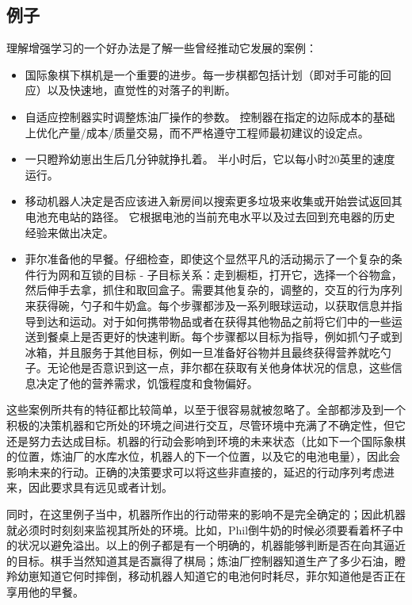 \documentclass{ctexart}
\begin{document}
        \subsection{例子}
            理解增强学习的一个好办法是了解一些曾经推动它发展的案例：
            \begin{itemize}
              \item 国际象棋下棋机是一个重要的进步。每一步棋都包括计划（即对手可能的回应）以及快速地，直觉性的对落子的判断。
              \item 自适应控制器实时调整炼油厂操作的参数。 控制器在指定的边际成本的基础上优化产量/成本/质量交易，而不严格遵守工程师最初建议的设定点。
              \item 一只瞪羚幼崽出生后几分钟就挣扎着。 半小时后，它以每小时20英里的速度运行。
              \item 移动机器人决定是否应该进入新房间以搜索更多垃圾来收集或开始尝试返回其电池充电站的路径。 它根据电池的当前充电水平以及过去回到充电器的历史经验来做出决定。
              \item 菲尔准备他的早餐。仔细检查，即使这个显然平凡的活动揭示了一个复杂的条件行为网和互锁的目标 - 子目标关系：走到橱柜，打开它，选择一个谷物盒，然后伸手去拿，抓住和取回盒子。需要其他复杂的，调整的，交互的行为序列来获得碗，勺子和牛奶盒。每个步骤都涉及一系列眼球运动，以获取信息并指导到达和运动。对于如何携带物品或者在获得其他物品之前将它们中的一些运送到餐桌上是否更好的快速判断。每个步骤都以目标为指导，例如抓勺子或到冰箱，并且服务于其他目标，例如一旦准备好谷物并且最终获得营养就吃勺子。无论他是否意识到这一点，菲尔都在获取有关他身体状况的信息，这些信息决定了他的营养需求，饥饿程度和食物偏好。
            \end{itemize}

            这些案例所共有的特征都比较简单，以至于很容易就被忽略了。全部都涉及到一个积极的决策机器和它所处的环境之间进行交互，尽管环境中充满了不确定性，但它还是努力去达成目标。机器的行动会影响到环境的未来状态（比如下一个国际象棋的位置，炼油厂的水库水位，机器人的下一个位置，以及它的电池电量），因此会影响未来的行动。正确的决策要求可以将这些非直接的，延迟的行动序列考虑进来，因此要求具有远见或者计划。

            同时，在这里例子当中，机器所作出的行动带来的影响不是完全确定的；因此机器就必须时时刻刻来监视其所处的环境。比如，Phil倒牛奶的时候必须要看着杯子中的状况以避免溢出。以上的例子都是有一个明确的，机器能够判断是否在向其逼近的目标。棋手当然知道其是否赢得了棋局；炼油厂控制器知道生产了多少石油，瞪羚幼崽知道它何时摔倒，移动机器人知道它的电池何时耗尽，菲尔知道他是否正在享用他的早餐。
\end{document}
